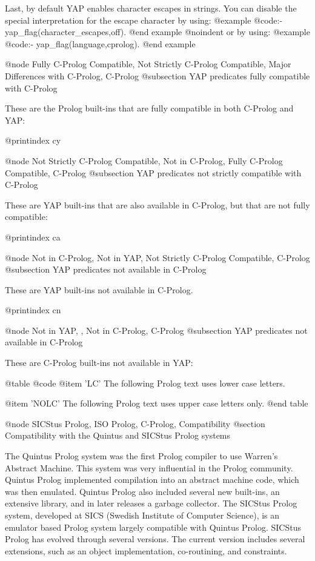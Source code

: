{{{{{{{{{Last, by default YAP enables character escapes in strings. You can
disable the special interpretation for the escape character by using:
@example
@code{:- yap_flag(character_escapes,off).}
@end example
@noindent
or by using:
@example
@code{:- yap_flag(language,cprolog).}
@end example

@node Fully C-Prolog Compatible, Not Strictly C-Prolog Compatible, Major Differences with C-Prolog, C-Prolog
@subsection YAP predicates fully compatible with C-Prolog

These are the Prolog built-ins that are fully compatible in both
C-Prolog and YAP:

@printindex cy

@node Not Strictly C-Prolog Compatible, Not in C-Prolog, Fully C-Prolog Compatible, C-Prolog
@subsection YAP predicates not strictly compatible with C-Prolog

These are YAP built-ins that are also available in C-Prolog, but
that are not fully compatible:

@printindex ca

@node Not in C-Prolog, Not in YAP, Not Strictly C-Prolog Compatible, C-Prolog
@subsection YAP predicates not available in C-Prolog

These are YAP built-ins not available in C-Prolog.

@printindex cn

@node Not in YAP, , Not in C-Prolog, C-Prolog
@subsection YAP predicates not available in C-Prolog

These are C-Prolog built-ins not available in YAP:

@table @code
@item 'LC'
The following Prolog text uses lower case letters.

@item 'NOLC'
The following Prolog text uses upper case letters only.
@end table

@node SICStus Prolog, ISO Prolog, C-Prolog, Compatibility
@section Compatibility with the Quintus and SICStus Prolog systems

The Quintus Prolog system was the first Prolog compiler to use Warren's
Abstract Machine. This system was very influential in the Prolog
community. Quintus Prolog implemented compilation into an abstract
machine code, which was then emulated. Quintus Prolog also included
several new built-ins, an extensive library, and in later releases a
garbage collector. The SICStus Prolog system, developed at SICS (Swedish
Institute of Computer Science), is an emulator based Prolog system
largely compatible with Quintus Prolog. SICStus Prolog has evolved
through several versions. The current version includes several
extensions, such as an object implementation, co-routining, and
constraints.

}}}}}}}}}
